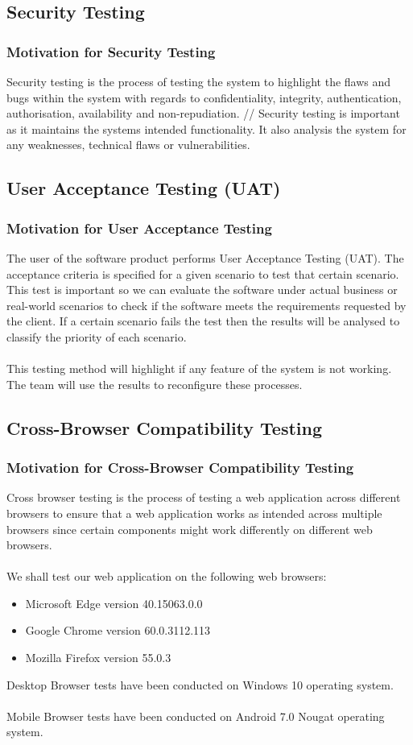 \documentclass{article}
\begin{document}
\subsection{Security Testing}
\subsubsection{Motivation for Security Testing} 
Security testing is the process of testing the system to highlight the flaws and bugs within the system with regards to confidentiality, integrity, authentication, authorisation, availability and non-repudiation. //
Security testing is important as it maintains the systems intended functionality. It also analysis the system for any weaknesses, technical flaws or vulnerabilities.
\subsection{User Acceptance Testing (UAT)}
\subsubsection{Motivation for User Acceptance Testing} 
The user of the software product performs User Acceptance Testing (UAT). The acceptance criteria is specified for a given scenario to test that certain scenario. This test is important so we can evaluate the software under actual business or real-world scenarios to check if the software meets the requirements requested by the client. If a certain scenario fails the test then the results will be analysed to classify the priority of each scenario.\\ \\
This testing method will highlight if any feature of the system is not working. The team will use the results to reconfigure these processes.
\subsection{Cross-Browser Compatibility Testing}
\subsubsection{Motivation for Cross-Browser Compatibility Testing} 
Cross browser testing is the process of testing a web application across different browsers to ensure that a web application works as intended across multiple browsers since certain components might work differently on different web browsers. \\ \\
We shall test our web application on the following web browsers: 
\begin{itemize}
\item Microsoft Edge version 40.15063.0.0
\item Google Chrome version 60.0.3112.113
\item Mozilla Firefox version 55.0.3 
\end{itemize}
Desktop Browser tests have been conducted on Windows 10 operating system. \\ \\
Mobile Browser tests have been conducted on Android 7.0 Nougat operating system. 
\end{document}
